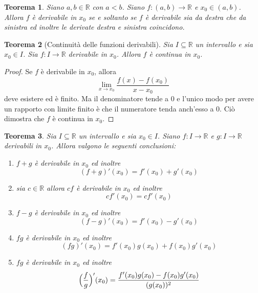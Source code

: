 \documentclass[11pt]{book}
\newtheorem{theorem}{Teorema}[chapter]
\begin{document}
\begin{theorem}
    Siano $a,b\in\mathbb{R}$ con $a<b$. Siano $f:(a,b)\rightarrow\mathbb{R}$ e $x_0\in(a,b)$. Allora $f$ è derivabile in
    $x_0$ se e soltanto se $f$ è derivabile sia da destra che da sinistra ed inoltre le derivate destra e sinistra coincidono.
\end{theorem}
\begin{theorem}[Continuità delle funzioni derivabili]
    Sia $I\subseteq\mathbb{R}$ un intervallo e sia $x_0\in I$. Sia $f:I\rightarrow\mathbb{R}$ derivabile in $x_0$. Allora 
    $f$ è continua in $x_0$.
\end{theorem}
\begin{proof}
    Se $f$ è derivabile in $x_0$, allora 
    \begin{equation*}
        \lim_{x\rightarrow x_0}\frac{f(x)-f(x_0)}{x-x_0}
    \end{equation*}
    deve esistere ed è finito. Ma il denominatore tende a 0 e l'unico modo per avere un rapporto con limite finito è che 
    il numeratore tenda anch'esso a 0. Ciò dimostra che $f$ è continua in $x_0$.
\end{proof}
\begin{theorem}
    Sia $I\subseteq\mathbb{R}$ un intervallo e sia $x_0\in I$. Siano $f:I\rightarrow\mathbb{R}$ e $g:I\rightarrow\mathbb{R}$
    derivabili in $x_0$. Allora valgono le seguenti conclusioni:
    \begin{enumerate}
        \item $f+g$ è derivabile in $x_0$ ed inoltre 
        \begin{equation*}
            (f+g)'(x_0)=f'(x_0)+g'(x_0)
        \end{equation*}
        \item sia $c\in\mathbb{R}$ allora $cf$ è derivabile in $x_0$ ed inoltre 
        \begin{equation*}
            cf'(x_0)=cf'(x_0)
        \end{equation*}
        \item $f-g$ è derivabile in $x_0$ ed inoltre 
        \begin{equation*}
            (f-g)'(x_0)=f'(x_0)-g'(x_0)
        \end{equation*}
        \item $fg$ è derivabile in $x_0$ ed inoltre 
        \begin{equation*}
            (fg)'(x_0)=f'(x_0)g(x_0)+f(x_0)g'(x_0)
        \end{equation*}
        \item $fg$ è derivabile in $x_0$ ed inoltre 
        \begin{equation*}
            \Bigl(\frac{f}{g}\Bigr)'(x_0)=\frac{f'(x_0)g(x_0)-f(x_0)g'(x_0)}{(g(x_0))^2}
        \end{equation*}
    \end{enumerate}
\end{theorem}
\end{document}
